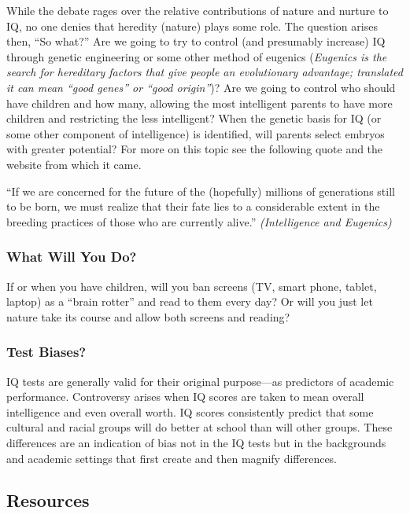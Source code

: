 \documentclass[
]{book}
\begin{document}
While the debate rages over the relative contributions of nature and nurture to IQ, no one denies that heredity (nature) plays some role. The question arises then, ``So what?'' Are we going to try to control (and presumably increase) IQ through genetic engineering or some other method of eugenics (\emph{Eugenics is the search for hereditary factors that give people an evolutionary advantage; translated it can mean ``good genes'' or ``good origin''})? Are we going to control who should have children and how many, allowing the most intelligent parents to have more children and restricting the less intelligent? When the genetic basis for IQ (or some other component of intelligence) is identified, will parents select embryos with greater potential? For more on this topic see the following quote and the website from which it came.

``If we are concerned for the future of the (hopefully) millions of generations still to be born, we must realize that their fate lies to a considerable extent in the breeding practices of those who are currently alive.'' \emph{(Intelligence and Eugenics)}

\hypertarget{what-will-you-do}{%
\subsubsection{What Will You Do?}\label{what-will-you-do}}

If or when you have children, will you ban screens (TV, smart phone, tablet, laptop) as a ``brain rotter'' and read to them every day? Or will you just let nature take its course and allow both screens and reading?

\hypertarget{test-biases}{%
\subsubsection{Test Biases?}\label{test-biases}}

IQ tests are generally valid for their original purpose---as predictors of academic performance. Controversy arises when IQ scores are taken to mean overall intelligence and even overall worth. IQ scores consistently predict that some cultural and racial groups will do better at school than will other groups. These differences are an indication of bias not in the IQ tests but in the backgrounds and academic settings that first create and then magnify differences.

\hypertarget{resources-3}{%
\subsection*{Resources}\label{resources-3}}
\end{document}
